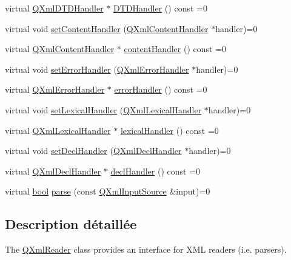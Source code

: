 \begin{DoxyCompactItemize}
\item 
virtual \hyperlink{class_q_xml_d_t_d_handler}{Q\+Xml\+D\+T\+D\+Handler} $\ast$ \hyperlink{class_q_xml_reader_a0832dd13efffc74b0a8aa43323455cfe}{D\+T\+D\+Handler} () const  =0
\item 
virtual void \hyperlink{class_q_xml_reader_a767bc5a20ea120ffc2d60f5c42fb28cd}{set\+Content\+Handler} (\hyperlink{class_q_xml_content_handler}{Q\+Xml\+Content\+Handler} $\ast$handler)=0
\item 
virtual \hyperlink{class_q_xml_content_handler}{Q\+Xml\+Content\+Handler} $\ast$ \hyperlink{class_q_xml_reader_ad2e52224886855deaf0349dc85eff840}{content\+Handler} () const  =0
\item 
virtual void \hyperlink{class_q_xml_reader_a97cab92522d1ceb8f6da94a161a72ee2}{set\+Error\+Handler} (\hyperlink{class_q_xml_error_handler}{Q\+Xml\+Error\+Handler} $\ast$handler)=0
\item 
virtual \hyperlink{class_q_xml_error_handler}{Q\+Xml\+Error\+Handler} $\ast$ \hyperlink{class_q_xml_reader_ab625c3e0cdaf00f5f0e6dd94754c48cd}{error\+Handler} () const  =0
\item 
virtual void \hyperlink{class_q_xml_reader_ab38c3816bacd14e3efcb8a5e0e5630be}{set\+Lexical\+Handler} (\hyperlink{class_q_xml_lexical_handler}{Q\+Xml\+Lexical\+Handler} $\ast$handler)=0
\item 
virtual \hyperlink{class_q_xml_lexical_handler}{Q\+Xml\+Lexical\+Handler} $\ast$ \hyperlink{class_q_xml_reader_a76b4e75f17184efdafffe29bf6786d6a}{lexical\+Handler} () const  =0
\item 
virtual void \hyperlink{class_q_xml_reader_a6d16a9420620f829cacb2cdb256d80a7}{set\+Decl\+Handler} (\hyperlink{class_q_xml_decl_handler}{Q\+Xml\+Decl\+Handler} $\ast$handler)=0
\item 
virtual \hyperlink{class_q_xml_decl_handler}{Q\+Xml\+Decl\+Handler} $\ast$ \hyperlink{class_q_xml_reader_adc0ffc51f79d0ef38cb3fa83682c1415}{decl\+Handler} () const  =0
\item 
virtual \hyperlink{qglobal_8h_a1062901a7428fdd9c7f180f5e01ea056}{bool} \hyperlink{class_q_xml_reader_a5f7ba5edeea40d6042c63beab50866b2}{parse} (const \hyperlink{class_q_xml_input_source}{Q\+Xml\+Input\+Source} \&input)=0
\end{DoxyCompactItemize}


\subsection{Description détaillée}
The \hyperlink{class_q_xml_reader}{Q\+Xml\+Reader} class provides an interface for X\+M\+L readers (i.\+e. parsers). 

